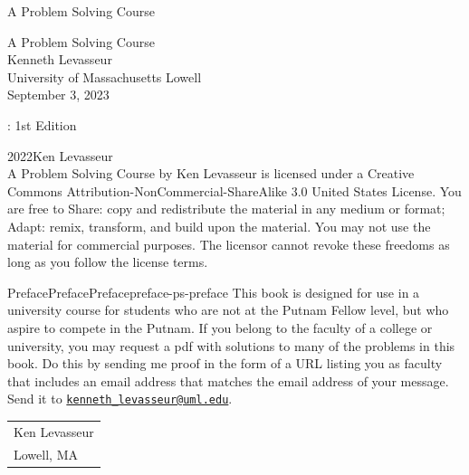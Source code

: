 \documentclass[oneside,10pt,]{book}
\newcommand{\titlepagefont}{\relax}
\numberwithin{equation}{section}
\begin{document}
\raggedbottom
\frontmatter
\thispagestyle{empty}
{\titlepagefont\centering
\vspace*{0.28\textheight}
{\Huge A Problem Solving Course}\\}
\clearpage
\thispagestyle{empty}
{\titlepagefont\centering
\vspace*{0.14\textheight}
{\Huge A Problem Solving Course}\\[3\baselineskip]
{\Large Kenneth Levasseur}\\[0.5\baselineskip]
{\Large University of Massachusetts Lowell}\\[3\baselineskip]
{\Large September 3, 2023}\\}
\clearpage
\thispagestyle{empty}
\hypertarget{colophon-ps-index-b}{}
: 1st Edition\par\medskip
\noindent\textcopyright{}2022\quad{}Ken Levasseur\\[0.5\baselineskip]
A Problem Solving Course by  Ken Levasseur is licensed under a Creative Commons Attribution-NonCommercial-ShareAlike 3.0 United States License. You are free to Share: copy and redistribute the material in any medium or format; Adapt: remix, transform, and build upon the material. You may not use the material for commercial purposes.  The licensor cannot revoke these freedoms as long as you follow the license terms.\par\medskip
{}
\null\clearpage
%
%
\typeout{************************************************}
\typeout{************************************************}
%
\begin{preface}{Preface}{Preface}{}{Preface}{}{}{preface-ps-preface}
This book is designed for use in a university course for students who are not at the Putnam Fellow level, but who aspire to compete in the Putnam.  If you belong to the faculty of a college or university, you may request a pdf with solutions to many of the problems in this book. Do this by sending me proof in the form of a URL listing you as faculty that includes an email address that matches the email address of your message.  Send it to \href{mailto:kenneth_levasseur@uml.edu}{\nolinkurl{kenneth_levasseur@uml.edu}}.%
\nopagebreak\par%
\hfill\begin{tabular}[t]{l@{}}
Ken Levasseur\\
Lowell, MA
\end{tabular}\\\par
\end{preface}
\end{document}

